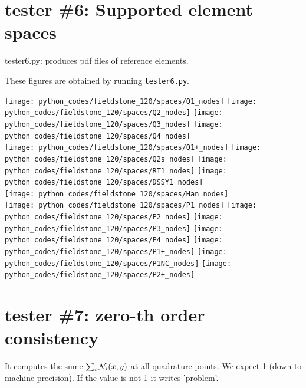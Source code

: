 \section*{tester \#6: Supported element spaces}

{\pythonfile tester6.py}: produces pdf files of reference elements.

These figures are obtained by running \lstinline{tester6.py}.

\begin{center}
\texttt{[image: python\_codes/fieldstone\_120/spaces/Q1\_nodes]}
\texttt{[image: python\_codes/fieldstone\_120/spaces/Q2\_nodes]}
\texttt{[image: python\_codes/fieldstone\_120/spaces/Q3\_nodes]}
\texttt{[image: python\_codes/fieldstone\_120/spaces/Q4\_nodes]}\\
\texttt{[image: python\_codes/fieldstone\_120/spaces/Q1+\_nodes]}
\texttt{[image: python\_codes/fieldstone\_120/spaces/Q2s\_nodes]}
\texttt{[image: python\_codes/fieldstone\_120/spaces/RT1\_nodes]}
\texttt{[image: python\_codes/fieldstone\_120/spaces/DSSY1\_nodes]}\\
\texttt{[image: python\_codes/fieldstone\_120/spaces/Han\_nodes]}\\
\texttt{[image: python\_codes/fieldstone\_120/spaces/P1\_nodes]}
\texttt{[image: python\_codes/fieldstone\_120/spaces/P2\_nodes]}
\texttt{[image: python\_codes/fieldstone\_120/spaces/P3\_nodes]}
\texttt{[image: python\_codes/fieldstone\_120/spaces/P4\_nodes]}
\texttt{[image: python\_codes/fieldstone\_120/spaces/P1+\_nodes]}
\texttt{[image: python\_codes/fieldstone\_120/spaces/P1NC\_nodes]}
\texttt{[image: python\_codes/fieldstone\_120/spaces/P2+\_nodes]}
\end{center}


\newpage
\section*{tester \#7: zero-th order consistency}

It computes the sume $\sum_i {\mathcal{N}}_i(x,y)$ at all quadrature points. 
We expect 1 (down to machine precision). If the value is not 1 it 
writes 'problem'.

